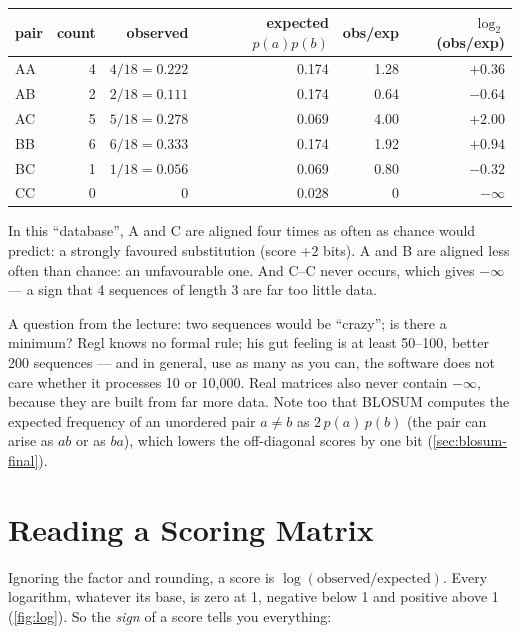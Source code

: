 \documentclass[11pt, oneside]{book}
\newcommand{\obs}{\mathrm{observed}}
\newcommand{\expd}{\mathrm{expected}}
\let\originalsection\section
\renewcommand{\section}{\Needspace{7\baselineskip}\originalsection}
\begin{document}
\begin{center}
\small
\begin{tabular}{@{}lrrrrr@{}}
\toprule
pair & count & observed & expected $p(a)p(b)$ & obs/exp & $\log_2$(obs/exp) \\
\midrule
AA & 4 & $4/18 = 0.222$ & 0.174 & 1.28 & $+0.36$ \\
AB & 2 & $2/18 = 0.111$ & 0.174 & 0.64 & $-0.64$ \\
AC & 5 & $5/18 = 0.278$ & 0.069 & 4.00 & $+2.00$ \\
BB & 6 & $6/18 = 0.333$ & 0.174 & 1.92 & $+0.94$ \\
BC & 1 & $1/18 = 0.056$ & 0.069 & 0.80 & $-0.32$ \\
CC & 0 & $0$            & 0.028 & 0    & $-\infty$ \\
\bottomrule
\end{tabular}
\end{center}

In this ``database'', A and C are aligned four times as often as chance
would predict: a strongly favoured substitution (score $+2$ bits). A and B are
aligned less often than chance: an unfavourable one. And C--C never occurs,
which gives $-\infty$ --- a sign that 4 sequences of length 3 are far too
little data.

\begin{notebox}[title={How much data is enough}]
A question from the lecture: two sequences would be ``crazy''; is there a
minimum? Regl knows no formal rule; his gut feeling is at least 50--100,
better 200 sequences --- and in general, use as many as you can, the software
does not care whether it processes 10 or 10,000. Real matrices also never
contain $-\infty$, because they are built from far more data. Note too that
BLOSUM computes the expected frequency of an unordered pair $a \ne b$ as
$2\,p(a)\,p(b)$ (the pair can arise as $ab$ or as $ba$), which lowers the
off-diagonal scores by one bit (\cref{sec:blosum-final}).
\end{notebox}

\section{Reading a Scoring Matrix}

Ignoring the factor and rounding, a score is $\log(\obs/\expd)$. Every
logarithm, whatever its base, is zero at 1, negative below 1 and positive
above 1 (\cref{fig:log}). So the \emph{sign} of a score tells you everything:
\end{document}

